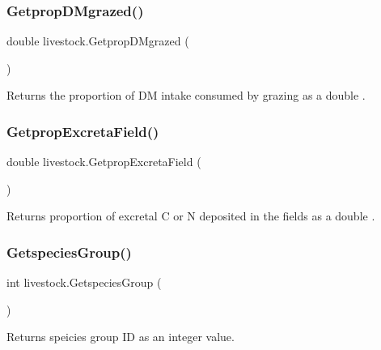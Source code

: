 \subsubsection{\texorpdfstring{GetpropDMgrazed()}{GetpropDMgrazed()}}
{\footnotesize\ttfamily double livestock.\+Getprop\+D\+Mgrazed (\begin{DoxyParamCaption}{ }\end{DoxyParamCaption})\hspace{0.3cm}{\ttfamily [inline]}}



Returns the proportion of DM intake consumed by grazing as a double . 

\mbox{\label{classlivestock_a649ac223461d7deda6829ca476f3b16a}} 
\subsubsection{\texorpdfstring{GetpropExcretaField()}{GetpropExcretaField()}}
{\footnotesize\ttfamily double livestock.\+Getprop\+Excreta\+Field (\begin{DoxyParamCaption}{ }\end{DoxyParamCaption})\hspace{0.3cm}{\ttfamily [inline]}}



Returns proportion of excretal C or N deposited in the fields as a double . 

\mbox{\label{classlivestock_a200482fb144d5a84bacd585f9d5cf8f5}} 
\subsubsection{\texorpdfstring{GetspeciesGroup()}{GetspeciesGroup()}}
{\footnotesize\ttfamily int livestock.\+Getspecies\+Group (\begin{DoxyParamCaption}{ }\end{DoxyParamCaption})\hspace{0.3cm}{\ttfamily [inline]}}



Returns speicies group ID as an integer value. 

